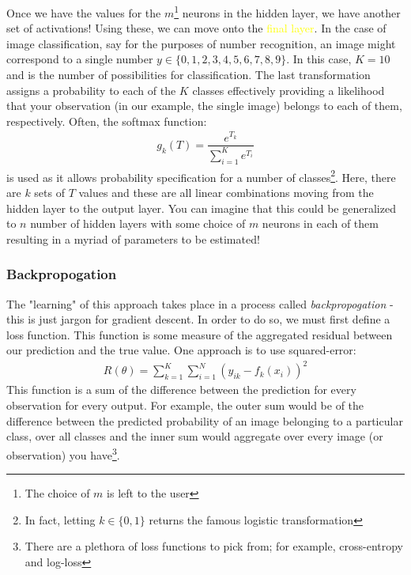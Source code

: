 \documentclass{article}
\begin{document}
\noindent Once we have the values for the $m$\footnote{The choice of $m$ is left to the user} neurons in the hidden layer, we have another set of activations! Using these, we can move onto the \textcolor{yellow}{final layer}. In the case of image classification, say for the purposes of number recognition, an image might correspond to a single number $y \in \{0, 1, 2, 3, 4, 5, 6, 7, 8, 9\}$. In this case, $K = 10$ and is the number of possibilities for classification. The last transformation assigns a probability to each of the $K$ classes effectively providing a likelihood that your observation (in our example, the single image) belongs to each of them, respectively. Often, the softmax function:
\begin{align}
    g_{k}(T) = \dfrac{e^{T_k}}{\sum_{i = 1}^{K}e^{T_i}}
\end{align}
\noindent is used as it allows probability specification for a number of classes\footnote{In fact, letting $k \in \{0, 1\}$ returns the famous logistic transformation}. Here, there are $k$ sets of $T$ values and these are all linear combinations moving from the hidden layer to the output layer. You can imagine that this could be generalized to $n$ number of hidden layers with some choice of $m$ neurons in each of them resulting in a myriad of parameters to be estimated!

\subsubsection{Backpropogation}

\noindent The "learning" of this approach takes place in a process called \textit{backpropogation} - this is just jargon for gradient descent. In order to do so, we must first define a loss function. This function is some measure of the aggregated residual between our prediction and the true value. One approach is to use squared-error:
\begin{align}
    R(\theta) = \sum_{k = 1}^{K}\sum_{i = 1}^{N}(y_{ik} - f_{k}(x_i))^2
\end{align}
\noindent This function is a sum of the difference between the prediction for every observation for every output. For example, the outer sum would be of the difference between the predicted probability of an image belonging to a particular class, over all classes and the inner sum would aggregate over every image (or observation) you have\footnote{There are a plethora of loss functions to pick from; for example, cross-entropy and log-loss}. 
\end{document}
